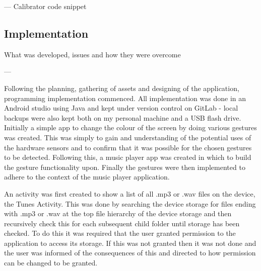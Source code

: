 \documentclass{l4proj}
\begin{document}
--- Calibrator code snippet


\subsection{Implementation}

What was developed, issues and how they were overcome

---

Following the planning, gathering of assets and designing of the application, programming implementation commenced. All implementation was done in an Android studio using Java and kept under version control on GitLab - local backups were also kept both on my personal machine and a USB flash drive. Initially a simple app to change the colour of the screen by doing various gestures was created. This was simply to gain and understanding of the potential uses of the hardware sensors and to confirm that it was possible for the chosen gestures to be detected. Following this, a music player app was created in which to build the gesture functionality upon. Finally the gestures were then implemented to adhere to the context of the music player application.

An activity was first created to show a list of all .mp3 or .wav files on the device, the Tunes Activity. This was done by searching the device storage for files ending with .mp3 or .wav  at the top file hierarchy of the device storage and then recursively check this for each subsequent child folder until storage has been checked. To do this it was required that the user granted permission to the application to access its storage. If this was not granted then it was not done and the user was informed of the consequences of this and directed to how permission can be changed to be granted.
\end{document}
